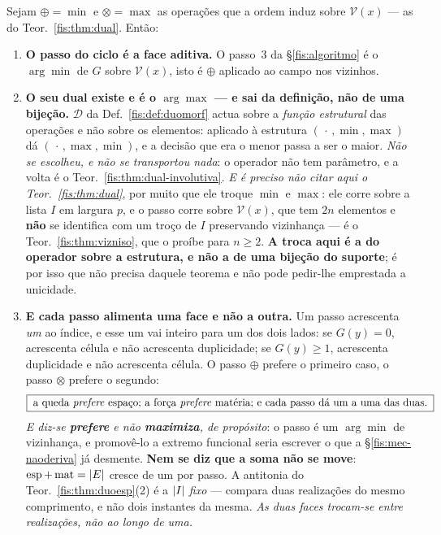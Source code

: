 \documentclass[livro.tex]{subfiles}
\begin{document}
\begin{teorema}\label{fis:thm:forca}
Sejam $\oplus=\min$ e $\otimes=\max$ as operações que a ordem induz sobre
$\mathcal{V}(x)$ --- as do Teor.~\ref{fis:thm:dual}. Então:
\begin{enumerate}\itemsep3pt
\item[(1)] \textbf{O passo do ciclo é a face aditiva.} O passo~3 da
§\ref{fis:algoritmo} é o $\arg\min$ de $G$ sobre $\mathcal{V}(x)$, isto é
$\oplus$ aplicado ao campo nos vizinhos.
\item[(2)] \textbf{O seu dual existe e é o $\arg\max$ --- e sai da definição, não
de uma bijeção.} $\mathcal{D}$ da Def.~\ref{fis:def:duomorf} actua sobre a
\emph{função estrutural} das operações e não sobre os elementos: aplicado à
estrutura $(\,\cdot\,,\min,\max)$ dá $(\,\cdot\,,\max,\min)$, e a decisão que era
o menor passa a ser o maior. \emph{Não se escolheu, e não se transportou nada}: o
operador não tem parâmetro, e a volta é o Teor.~\ref{fis:thm:dual-involutiva}.
\smallskip
\emph{E é preciso não citar aqui o Teor.~\ref{fis:thm:dual}}, por muito que ele
troque $\min$ e $\max$: ele corre sobre a lista $I$ em largura $p$, e o passo
corre sobre $\mathcal{V}(x)$, que tem $2n$ elementos e \textbf{não} se identifica
com um troço de $I$ preservando vizinhança --- é o
Teor.~\ref{fis:thm:vizniso}, que o proíbe para $n\ge2$. \textbf{A troca aqui é a
do operador sobre a estrutura, e não a de uma bijeção do suporte}; é por isso que
não precisa daquele teorema e não pode pedir-lhe emprestada a unicidade.
\item[(3)] \textbf{E cada passo alimenta uma face e não a outra.} Um passo
acrescenta \emph{um} ao índice, e esse um vai inteiro para um dos dois lados: se
$G(y)=0$, acrescenta célula e não acrescenta duplicidade; se $G(y)\ge1$,
acrescenta duplicidade e não acrescenta célula. O passo $\oplus$ prefere o
primeiro caso, o passo $\otimes$ prefere o segundo:
\[
\boxed{\;\text{a queda \emph{prefere} espaço; a força \emph{prefere} matéria; e cada passo dá um a uma das duas.}\;}
\]
\emph{E diz-se \textbf{prefere} e não \textbf{maximiza}, de propósito}: o passo é
um $\arg\min$ de vizinhança, e promovê-lo a extremo funcional seria escrever o
que a §\ref{fis:mec-naoderiva} já desmente. \textbf{Nem se diz que a soma não se
move}: $\operatorname{esp}+\operatorname{mat}=\lvert E\rvert$ cresce de um por passo. A
antitonia do Teor.~\ref{fis:thm:duoesp}(2) é a $\lvert I\rvert$ \emph{fixo} --- compara
duas realizações do mesmo comprimento, e não dois instantes da mesma. \emph{As
duas faces trocam-se entre realizações, não ao longo de uma.}

\end{enumerate}
\end{teorema}
\end{document}
